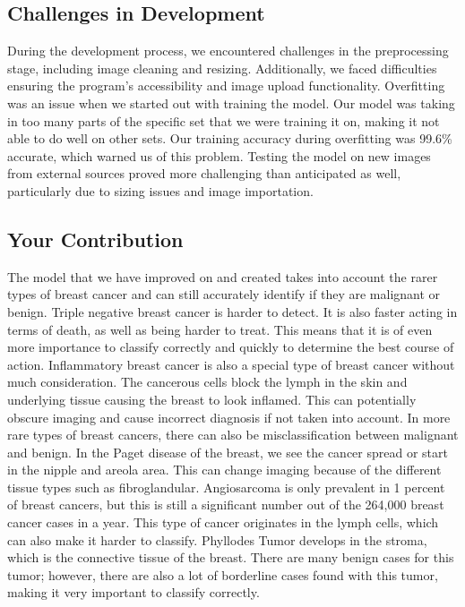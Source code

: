 \documentclass{article}
\begin{document}
\subsection{Challenges in Development}
During the development process, we encountered challenges in the preprocessing stage, including image cleaning and resizing. Additionally, we faced difficulties ensuring the program's accessibility and image upload functionality. Overfitting was an issue when we started out with training the model. Our model was taking in too many parts of the specific set that we were training it on, making it not able to do well on other sets. Our training accuracy during overfitting was 99.6\% accurate, which warned us of this problem. Testing the model on new images from external sources proved more challenging than anticipated as well, particularly due to sizing issues and image importation.

\subsection{Your Contribution}
The model that we have improved on and created takes into account the rarer types of breast cancer and can still accurately identify if they are malignant or benign. Triple negative breast cancer is harder to detect. It is also faster acting in terms of death, as well as being harder to treat. This means that it is of even more importance to classify correctly and quickly to determine the best course of action. Inflammatory breast cancer is also a special type of breast cancer without much consideration. The cancerous cells block the lymph in the skin and underlying tissue causing the breast to look inflamed. This can potentially obscure imaging and cause incorrect diagnosis if not taken into account. In more rare types of breast cancers, there can also be misclassification between malignant and benign. In the Paget disease of the breast, we see the cancer spread or start in the nipple and areola area. This can change imaging because of the different tissue types such as fibroglandular. Angiosarcoma is only prevalent in 1 percent of breast cancers, but this is still a significant number out of the 264,000 breast cancer cases in a year. This type of cancer originates in the lymph cells, which can also make it harder to classify. Phyllodes Tumor develops in the stroma, which is the connective tissue of the breast. There are many benign cases for this tumor; however, there are also a lot of borderline cases found with this tumor, making it very important to classify correctly.
\end{document}
